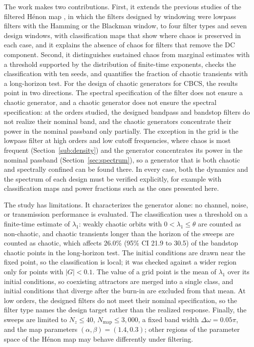 \documentclass[journal]{IEEEtran}
\begin{document}
The work makes two contributions. First, it extends the previous studies of
the filtered H\'enon map \cite{BorgesCNSNS2024,BorgesCSF2022,Borges2022sbrt,CNMAC2023},
in which the filters designed by windowing were lowpass filters with the
Hamming or the Blackman window, to four filter types and seven design windows,
with classification maps that show where chaos is preserved in each case, and
it explains the absence of chaos for filters that remove the DC component.
Second, it distinguishes sustained chaos from marginal estimates with a
threshold supported by the distribution of finite-time exponents, checks the
classification with ten seeds, and quantifies the fraction of chaotic
transients with a long-horizon test.
For the design of chaotic generators for CBCS, the results point in two
directions. The spectral specification of the filter does not ensure a chaotic
generator, and a chaotic generator does not ensure the spectral specification:
at the orders studied, the designed bandpass and bandstop filters do not
realize their nominal band, and the chaotic generators concentrate their power
in the nominal passband only partially. The exception in the grid is the
lowpass filter at high orders and low cutoff frequencies, where chaos is most
frequent (Section~\ref{sub:density}) and the generator concentrates its power
in the nominal passband (Section~\ref{sec:spectrum}), so a generator that is
both chaotic and spectrally confined can be found there. In every case, both
the dynamics and the spectrum of each design must be verified explicitly, for
example with classification maps and power fractions such as the ones
presented here.

The study has limitations. It characterizes the generator alone: no channel,
noise, or transmission performance is evaluated. The classification uses a threshold on a
finite-time estimate of $\lambda_1$: weakly chaotic orbits with
$0<\lambda_1\le\theta$ are counted as non-chaotic, and chaotic transients longer
than the horizon of the sweeps are counted as chaotic, which affects 26.0\%
(95\% CI 21.9 to 30.5) of the bandstop chaotic points in the long-horizon
test. The initial
conditions are drawn near the fixed point, so the classification is local; it
was checked against a wider region only for points with $|G|<0.1$. The value of
a grid point is the mean of $\lambda_1$ over its initial conditions, so
coexisting attractors are merged into a single class, and initial conditions
that diverge after the burn-in are excluded from that mean. At low orders, the
designed filters do not meet their nominal specification, so the filter type
names the design target rather than the realized response. Finally, the sweeps
are limited to $N_z\le40$, $N_\text{map}\le3{,}000$, a fixed band width
$\Delta\omega=0.05\pi$, and the map parameters $(\alpha,\beta)=(1.4,0.3)$;
other regions of the parameter space of the H\'enon map \cite{Gallas1993} may
behave differently under filtering.
\end{document}
